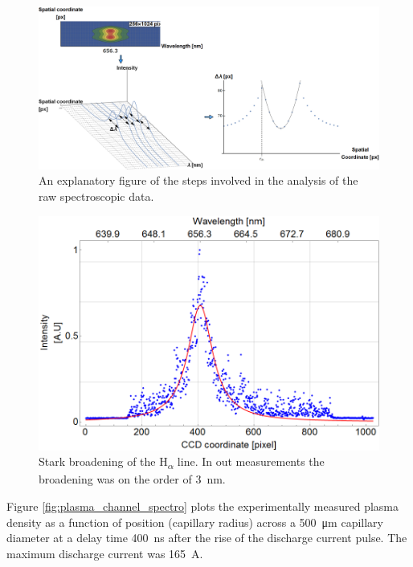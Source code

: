 \documentclass[../main.tex]{subfiles}
\begin{document}
\begin{figure}
    \centering
    \includegraphics[width=\textwidth]{figures/spectro/spectra_analysis.png}
    \caption{An explanatory figure of the steps involved in the analysis of the raw spectroscopic data.}
    \label{fig:spectra_analysis}
\end{figure}
\begin{figure}
    \centering
    \includegraphics[width=\textwidth]{figures/spectro/sample-lorentzian.png}
    \caption{Stark broadening of the H\textsubscript{$\alpha$} line. In out measurements the broadening was on the order of \SI{3}{\nm}.}
    \label{fig:single-lorentzian}
\end{figure}

Figure \ref{fig:plasma_channel_spectro} plots the experimentally measured plasma density as a function of position (capillary radius) across a \SI{500}{\um} capillary diameter at a delay time \SI{400}{\ns} after the rise of the discharge current pulse. The maximum discharge current was \SI{165}{\A}.
\end{document}
